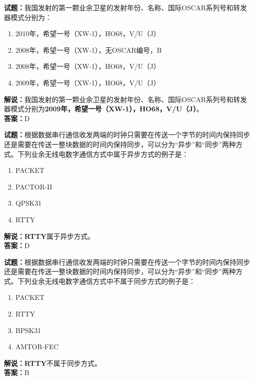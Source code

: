\documentclass{ctexbook}
\begin{document}
\bigskip


\noindent\textbf{试题：}我国发射的第一颗业余卫星的发射年份、名称、国际OSCAR系列号和转发器模式分别为：
\begin{enumerate}[leftmargin=3em]
\item 2010年，希望一号（XW-1），HO68，V/U（J）
\item 2008年，希望一号（XW-1），无OSCAR编号，B
\item 2008年，希望一号（XW-1），HO68，V/U（J）
\item 2009年，希望一号（XW-1），HO68，V/U（J）
\end{enumerate}
\noindent\textbf{解说：}我国发射的第一颗业余卫星的发射年份、名称、国际OSCAR系列号和转发器模式分别为\textbf{2009年，希望一号（XW-1），HO68，V/U（J）}。\\\noindent\textbf{答案：}D




\bigskip


\noindent\textbf{试题：}根据数据串行通信收发两端的时钟只需要在传送一个字节的时间内保持同步还是需要在传送一整块数据的时间内保持同步，可以分为“异步”和“同步”两种方式。下列业余无线电数字通信方式中属于异步方式的例子是：
\begin{enumerate}[leftmargin=3em]
\item PACKET
\item PACTOR-II
\item QPSK31
\item RTTY
\end{enumerate}
\noindent\textbf{解说：}\textbf{RTTY}属于异步方式。\\\noindent\textbf{答案：}D



\bigskip


\noindent\textbf{试题：}根据数据串行通信收发两端的时钟只需要在传送一个字节的时间内保持同步还是需要在传送一整块数据的时间内保持同步，可以分为“异步”和“同步”两种方式。下列业余无线电数字通信方式中不属于同步方式的例子是：
\begin{enumerate}[leftmargin=3em]
\item PACKET
\item RTTY
\item BPSK31
\item AMTOR-FEC
\end{enumerate}
\noindent\textbf{解说：}\textbf{RTTY}不属于同步方式。\\\noindent\textbf{答案：}B



\bigskip
\end{document}
